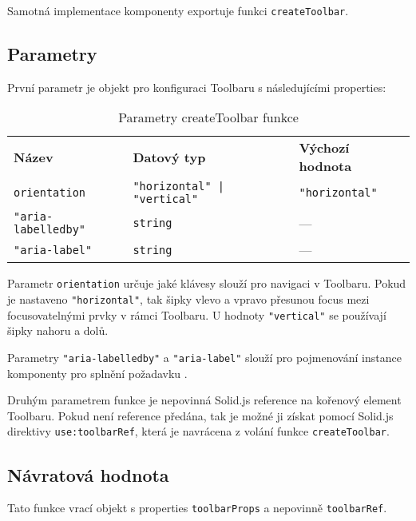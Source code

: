 Samotná implementace komponenty exportuje funkci \texttt{createToolbar}.

\subsection{Parametry}

První parametr je objekt pro konfiguraci Toolbaru s následujícími properties:

\clearpage

\begin{table}[ht]\label{table:toolbar-params}
    \begin{ctucolortab}
        \begin{tabularx}{\textwidth}{X X X}
            \bfseries Název            & \bfseries Datový typ               & \bfseries Výchozí hodnota \\\Midrule{}
            \texttt{orientation}       & \texttt{"horizontal" | "vertical"} & \texttt{"horizontal"}     \\
            \texttt{"aria-labelledby"} & \texttt{string}                    & ---                       \\
            \texttt{"aria-label"}      & \texttt{string}                    & ---
        \end{tabularx}
    \end{ctucolortab}
    \caption{Parametry createToolbar funkce}
\end{table}

Parametr \texttt{orientation} určuje jaké klávesy slouží pro navigaci v Toolbaru.
Pokud je nastaveno \texttt{"horizontal"}, tak šipky vlevo a vpravo přesunou focus mezi focusovatelnými prvky v rámci Toolbaru.
U hodnoty \texttt{"vertical"} se používají šipky nahoru a dolů.

Parametry \texttt{"aria-labelledby"} a \texttt{"aria-label"} slouží pro pojmenování instance komponenty pro splnění požadavku \href{ofr13}{}.

Druhým parametrem funkce je nepovinná Solid.js reference na kořenový element Toolbaru.
Pokud není reference předána, tak je možné ji získat pomocí Solid.js direktivy \texttt{use:toolbarRef}, která je navrácena z volání funkce \texttt{createToolbar}.

\subsection{Návratová hodnota}

Tato funkce vrací objekt s properties \texttt{toolbarProps} a nepovinně \texttt{toolbarRef}.

